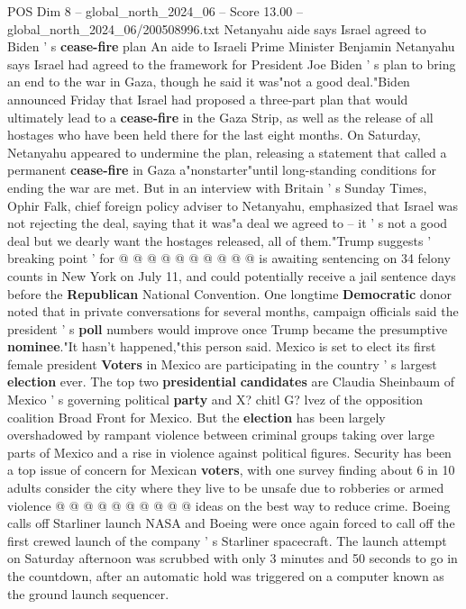 \begin{textsample}{POS Dim 8 – global\_north\_2024\_06 – Score 13.00 – global\_north\_2024\_06/200508996.txt}  \label{ex:f8_pos_061}
Netanyahu aide says Israel agreed to Biden ' s \textbf{cease-fire} plan An aide to Israeli Prime Minister Benjamin Netanyahu says Israel had agreed to the framework for President Joe Biden ' s plan to bring an end to the war in Gaza, though he said it was"not a good deal."Biden announced Friday that Israel had proposed a three-part plan that would ultimately lead to a \textbf{cease-fire} in the Gaza Strip, as well as the release of all hostages who have been held there for the last eight months.
On Saturday, Netanyahu appeared to undermine the plan, releasing a statement that called a permanent \textbf{cease-fire} in Gaza a"nonstarter"until long-standing conditions for ending the war are met.
But in an interview with Britain ' s Sunday Times, Ophir Falk, chief foreign policy adviser to Netanyahu, emphasized that Israel was not rejecting the deal, saying that it was"a deal we agreed to -- it ' s not a good deal but we dearly want the hostages released, all of them."Trump suggests ' breaking point ' for @ @ @ @ @ @ @ @ @ @ is awaiting sentencing on 34 felony counts in New York on July 11, and could potentially receive a jail sentence days before the \textbf{Republican} National Convention.
One longtime \textbf{Democratic} donor noted that in private conversations for several months, campaign officials said the president ' s \textbf{poll} numbers would improve once Trump became the presumptive \textbf{nominee}."It hasn't happened,"this person said.
Mexico is set to elect its first female president \textbf{Voters} in Mexico are participating in the country ' s largest \textbf{election} ever.
The top two \textbf{presidential} \textbf{candidates} are Claudia Sheinbaum of Mexico ' s governing political \textbf{party} and X? chitl G? lvez of the opposition coalition Broad Front for Mexico.
But the \textbf{election} has been largely overshadowed by rampant violence between criminal groups taking over large parts of Mexico and a rise in violence against political figures.
Security has been a top issue of concern for Mexican \textbf{voters}, with one survey finding about 6 in 10 adults consider the city where they live to be unsafe due to robberies or armed violence @ @ @ @ @ @ @ @ @ @ ideas on the best way to reduce crime.
Boeing calls off Starliner launch NASA and Boeing were once again forced to call off the first crewed launch of the company ' s Starliner spacecraft.
The launch attempt on Saturday afternoon was scrubbed with only 3 minutes and 50 seconds to go in the countdown, after an automatic hold was triggered on a computer known as the ground launch sequencer.

\end{textsample}
